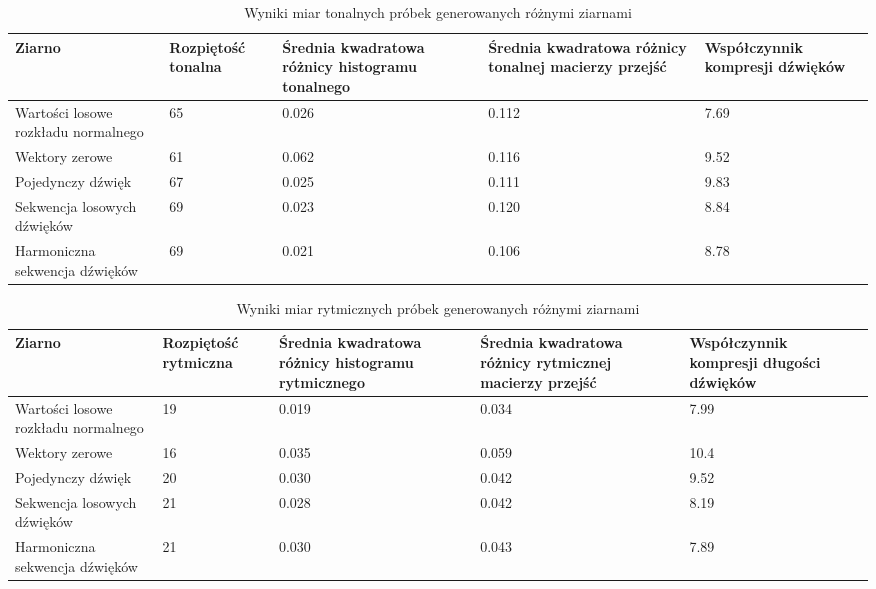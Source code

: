 {{        \begin{table}
            \caption{Wyniki miar tonalnych próbek generowanych różnymi ziarnami} \label{tonal_measuremnts_table}
            \begin{center}
                \begin{tabular}{ |p{2.5cm}|p{2.5cm}|p{2.5cm}|p{2.5cm}|p{2.5cm}| }
                \hline
                Ziarno & Rozpiętość tonalna & Średnia kwadratowa różnicy histogramu tonalnego & Średnia kwadratowa różnicy tonalnej macierzy przejść & Współczynnik kompresji dźwięków \\ 
                \hline
                \hline
                Wartości losowe rozkładu normalnego & 65 & 0.026 & 0.112 & 7.69 \\  
                \hline
                Wektory zerowe & 61 & 0.062 & 0.116 & 9.52 \\
                \hline
                Pojedynczy dźwięk & 67 & 0.025 & 0.111 & 9.83 \\
                \hline
                Sekwencja losowych dźwięków & 69 & 0.023 & 0.120 & 8.84 \\
                \hline
                Harmoniczna sekwencja dźwięków & 69 & 0.021 & 0.106  & 8.78 \\
                \hline
                \end{tabular}
            \end{center}
        \end{table}
        
        \begin{table}
            \caption{Wyniki miar rytmicznych próbek generowanych różnymi ziarnami} \label{rythm_measuremnts_table}
            \begin{center}
                \begin{tabular}{ |p{2.5cm}|p{2.5cm}|p{2.5cm}|p{2.5cm}|p{2.5cm}| }
                \hline
                Ziarno & Rozpiętość rytmiczna & Średnia kwadratowa różnicy histogramu rytmicznego & Średnia kwadratowa różnicy rytmicznej macierzy przejść & Współczynnik kompresji długości dźwięków \\ 
                \hline
                \hline
                Wartości losowe rozkładu normalnego & 19 & 0.019 & 0.034 & 7.99 \\  
                \hline
                Wektory zerowe & 16 & 0.035 & 0.059 & 10.4 \\
                \hline
                Pojedynczy dźwięk & 20 & 0.030 & 0.042 & 9.52 \\
                \hline
                Sekwencja losowych dźwięków & 21 & 0.028 & 0.042 & 8.19 \\
                \hline
                Harmoniczna sekwencja dźwięków & 21 & 0.030 & 0.043 & 7.89 \\
                \hline
                \end{tabular}
            \end{center}
        \end{table}

}}
